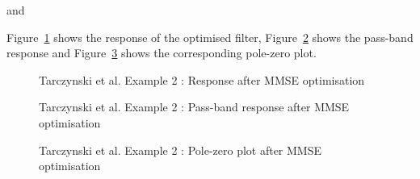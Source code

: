 \documentclass[a4paper,twoside,10pt,english]{report}
\begin{document}
and
\begin{small}

\end{small}
Figure~\ref{fig:Tarczynski-ex2-mmse-x1} shows the response of the optimised
filter, Figure~\ref{fig:Tarczynski-ex2-mmse-x1pass} shows the pass-band response
and Figure~\ref{fig:Tarczynski-ex2-mmse-x1pz} shows the corresponding pole-zero
plot.
\begin{figure}[!htbp]
\begin{center}
\scalebox{0.7}{}
\caption{Tarczynski et al. Example 2 : Response after MMSE optimisation}
\label{fig:Tarczynski-ex2-mmse-x1}
\end{center}
\end{figure}
\begin{figure}[!htbp]
\centering
\scalebox{0.7}{}
\caption{Tarczynski et al. Example 2 : Pass-band response after MMSE optimisation}
\label{fig:Tarczynski-ex2-mmse-x1pass}
\end{figure}
\begin{figure}[!htbp]
\begin{center}
\scalebox{0.7}{}
\caption{Tarczynski et al. Example 2 : Pole-zero plot after MMSE optimisation}
\label{fig:Tarczynski-ex2-mmse-x1pz}
\end{center}
\end{figure}
\clearpage
\end{document}
